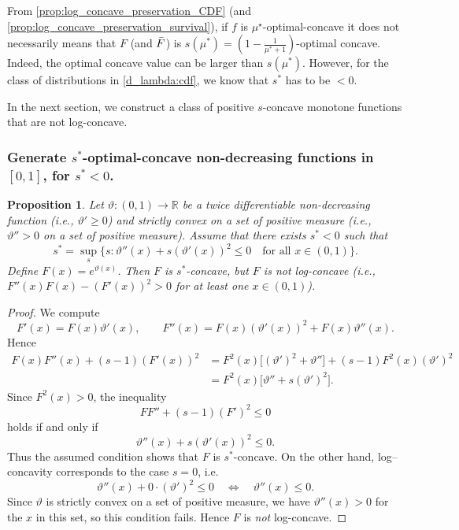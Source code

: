 \documentclass{article} %
\newtheorem{proposition}[theorem]{Proposition}
\begin{document}
From \cref{prop:log_concave_preservation_CDF} (and \cref{prop:log_concave_preservation_survival}), if $f$ is $\mu^{\star}$-optimal-concave it does not necessarily means that $F$ (and $\Bar{F}$) is $s(\mu^*)=\left(1-\frac{1}{\mu^*+1}\right)$-optimal concave. Indeed, the optimal concave value can be larger than $s(\mu^*)$. However, for the class of distributions in \cref{d_lambda:cdf}, we know that $s^*$ has to be $<0$. 

In the next section, we construct a class of positive $s$-concave monotone functions that are not log-concave.

\subsubsection{Generate $s^*$-optimal-concave non-decreasing functions in $[0,1]$, for $s^*<0$.}
\begin{proposition}
Let $\vartheta : (0,1)\to\mathbb{R}$ be a twice differentiable non-decreasing function (i.e., $\vartheta'\geq 0$) and strictly convex on a set of positive measure (i.e., $\vartheta''>0$ on a set of positive measure). Assume that there exists $s^*<0$ such that 
\[
s^* = \sup_s\{s:\vartheta''(x) + s(\vartheta'(x))^2 \le 0 \quad \text{for all }x\in(0,1)\}.
\]
Define $F(x)=e^{\vartheta(x)}$. Then $F$ is $s^*$-concave, but $F$ is not log-concave (i.e., $F''(x)F(x)-(F'(x))^2>0$ for at least one $x \in (0,1)$).

\end{proposition}

\begin{proof}
We compute
\[
F'(x)=F(x)\vartheta'(x), 
\qquad 
F''(x)=F(x)(\vartheta'(x))^2 + F(x)\vartheta''(x).
\]
Hence
\begin{align*}
F(x)F''(x)+(s-1)(F'(x))^2
&= F^2(x)\big[(\vartheta')^2+\vartheta''\big]
  + (s-1)F^2(x)(\vartheta')^2  \\
&= F^2(x)\big[\vartheta'' + s(\vartheta')^2\big].
\end{align*}
Since $F^2(x)>0$, the inequality
\[
F F'' + (s-1)(F')^2 \le 0
\]
holds if and only if
\[
\vartheta''(x) + s(\vartheta'(x))^2 \le 0.
\]
Thus the assumed condition shows that $F$ is $s^*$-concave. On the other hand, log–concavity corresponds to the case $s=0$, i.e.
\[
\vartheta''(x) + 0\cdot(\vartheta')^2 \le 0 \quad\Longleftrightarrow\quad \vartheta''(x)\le 0.
\]
Since $\vartheta$ is strictly convex on a set of positive measure, we have $\vartheta''(x)>0$ for the $x$ in this set, so this condition fails. Hence $F$ is \emph{not} log-concave.
\end{proof}
\end{document}
